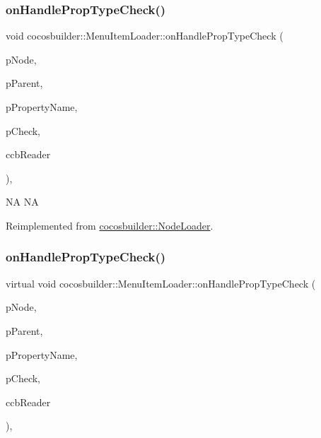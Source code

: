 \subsubsection{\texorpdfstring{on\+Handle\+Prop\+Type\+Check()}{onHandlePropTypeCheck()}\hspace{0.1cm}{\footnotesize\ttfamily [1/2]}}
{\footnotesize\ttfamily void cocosbuilder\+::\+Menu\+Item\+Loader\+::on\+Handle\+Prop\+Type\+Check (\begin{DoxyParamCaption}\item[{cocos2d\+::\+Node $\ast$}]{p\+Node,  }\item[{cocos2d\+::\+Node $\ast$}]{p\+Parent,  }\item[{const char $\ast$}]{p\+Property\+Name,  }\item[{bool}]{p\+Check,  }\item[{\hyperlink{classcocosbuilder_1_1CCBReader}{C\+C\+B\+Reader} $\ast$}]{ccb\+Reader }\end{DoxyParamCaption})\hspace{0.3cm}{\ttfamily [protected]}, {\ttfamily [virtual]}}

NA  NA 

Reimplemented from \hyperlink{classcocosbuilder_1_1NodeLoader}{cocosbuilder\+::\+Node\+Loader}.

\mbox{\label{classcocosbuilder_1_1MenuItemLoader_af19804cbfaa8df27b3813106a23d527c}} 
\subsubsection{\texorpdfstring{on\+Handle\+Prop\+Type\+Check()}{onHandlePropTypeCheck()}\hspace{0.1cm}{\footnotesize\ttfamily [2/2]}}
{\footnotesize\ttfamily virtual void cocosbuilder\+::\+Menu\+Item\+Loader\+::on\+Handle\+Prop\+Type\+Check (\begin{DoxyParamCaption}\item[{cocos2d\+::\+Node $\ast$}]{p\+Node,  }\item[{cocos2d\+::\+Node $\ast$}]{p\+Parent,  }\item[{const char $\ast$}]{p\+Property\+Name,  }\item[{bool}]{p\+Check,  }\item[{\hyperlink{classcocosbuilder_1_1CCBReader}{C\+C\+B\+Reader} $\ast$}]{ccb\+Reader }\end{DoxyParamCaption})\hspace{0.3cm}{\ttfamily [protected]}, {\ttfamily [virtual]}}

